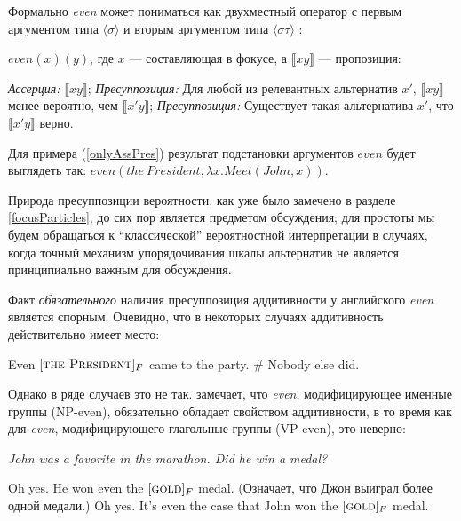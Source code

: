 \documentclass[a4paper, titlepage, 12pt]{article}
\begin{document}
Формально \textit{even} может пониматься как двухместный оператор с первым аргументом типа $ \langle \sigma \rangle $ и вторым аргументом типа $ \langle \sigma \tau \rangle $ \citep{wagner2006association}:

\begin{exe}
    \ex $ even(x)(y) $, где $ x $ --- составляющая в фокусе, а $ \llbracket xy \rrbracket $ --- пропозиция: \begin{xlist}
        \ex \textit{Ассерция:} $ \llbracket xy \rrbracket $;
        \ex \textit{Пресуппозиция:} Для любой из релевантных альтернатив $ x' $, $ \llbracket xy \rrbracket $ менее вероятно, чем $ \llbracket x'y \rrbracket $;
        \ex \textit{Пресуппозиция:} Существует такая альтернатива $ x' $, что $ \llbracket x'y \rrbracket $ верно.
    \end{xlist}
\end{exe}

Для примера (\ref{onlyAssPres}) результат подстановки аргументов $ even $ будет выглядеть так: $ even(the\ President, \lambda x.Meet(John, x)) $.

\medskip

Природа пресуппозиции вероятности, как уже было замечено в разделе \ref{focusParticles}, до сих пор является предметом обсуждения; для простоты мы будем обращаться к ``классической'' вероятностной интерпретации в случаях, когда точный механизм упорядочивания шкалы альтернатив не является принципиально важным для обсуждения. 

\medskip

Факт \textit{обязательного} наличия пресуппозиция аддитивности у английского \textit{even} является спорным. Очевидно, что в некоторых случаях аддитивность действительно имеет место:

\begin{exe}
    \ex Even $ [\textsc{the President}]_F $ came to the party. \# Nobody else did.
\end{exe}


Однако в ряде случаев это не так. \citep{wagner2015additivity} замечает, что \textit{even}, модифицирующее именные группы (NP-even), обязательно обладает свойством аддитивности, в то время как для \textit{even}, модифицирующего глагольные группы (VP-even), это неверно:

\begin{exe}
    \ex \textit{John was a favorite in the marathon. Did he win a medal?} \begin{xlist}
        \ex Oh yes. He won even the $ [\textsc{gold}]_F $ medal. (Означает, что Джон выиграл более одной медали.)
        \ex Oh yes. It’s even the case that John won the $ [\textsc{gold}]_F $ medal.
    \end{xlist}
\end{exe}
\end{document}
